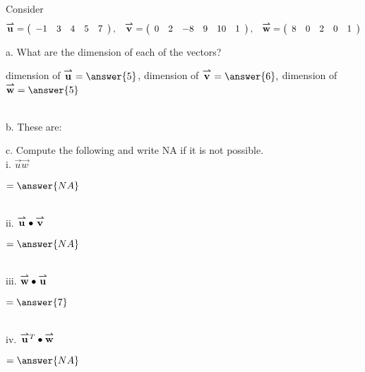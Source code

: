 \documentclass{ximera}
\author{Parisa Fatheddin}
\begin{document}
\begin{exercise}

Consider
\begin{equation*}
\vec{u} = \left(\begin{array}{ccccc} -1 & 3 & 4 & 5 & 7
\end{array}\right), \hspace{.3cm} \vec{v} = \left(\begin{array}{cccccc}
0 & 2 & -8 & 9 & 10 & 1
\end{array}\right), \hspace{.3cm} \vec{w} = \left(\begin{array}{ccccc}
8 & 0 & 2 & 0 & 1
\end{array}\right)
\end{equation*}

a. What are the dimension of each of the vectors? \\

\begin{prompt}
dimension of $\vec{u}= \answer{5}$, \hspace{.4cm} dimension of $\vec{v}= \answer{6},$ \hspace{.4cm} dimension of $\vec{w} = \answer{5}$
\end{prompt}\\

b. These are:
\begin{multipleChoice}
\end{multipleChoice}

c. Compute the following and write NA if it is not possible. \\

i. $\vec{u}\vec{w}$ \begin{prompt} $= \answer{NA}$\end{prompt}\\

ii. $\vec{u} \dotp \vec{v}$ \begin{prompt} $= \answer{NA}$\end{prompt}\\

iii. $\vec{w} \dotp \vec{u}$ \begin{prompt} $= \answer{7}$\end{prompt}\\

iv. $\vec{u}^{T} \dotp \vec{w}$ \begin{prompt} $= \answer{NA}$\end{prompt}\\


\end{exercise}
\end{document}
